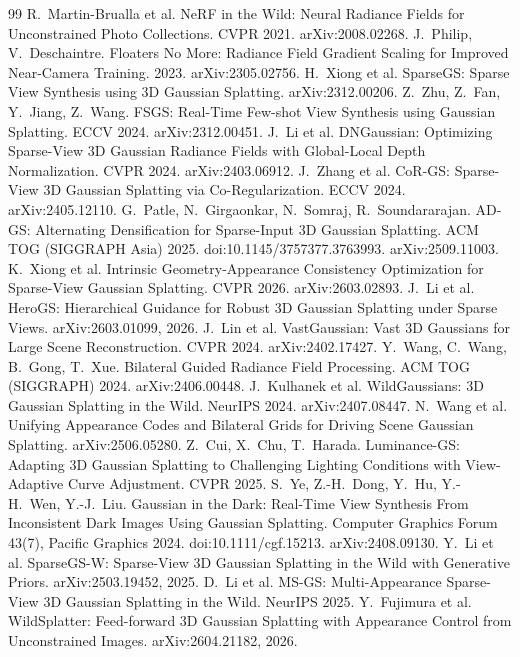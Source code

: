 \documentclass[11pt,a4paper]{article}
\begin{document}
\begin{thebibliography}{99}\small
{} R.~Martin-Brualla et al. NeRF in the Wild: Neural Radiance Fields for Unconstrained Photo Collections. CVPR 2021. arXiv:2008.02268.
 J.~Philip, V.~Deschaintre. Floaters No More: Radiance Field Gradient Scaling for Improved Near-Camera Training. 2023. arXiv:2305.02756.
 H.~Xiong et al. SparseGS: Sparse View Synthesis using 3D Gaussian Splatting. arXiv:2312.00206.
 Z.~Zhu, Z.~Fan, Y.~Jiang, Z.~Wang. FSGS: Real-Time Few-shot View Synthesis using Gaussian Splatting. ECCV 2024. arXiv:2312.00451.
 J.~Li et al. DNGaussian: Optimizing Sparse-View 3D Gaussian Radiance Fields with Global-Local Depth Normalization. CVPR 2024. arXiv:2403.06912.
 J.~Zhang et al. CoR-GS: Sparse-View 3D Gaussian Splatting via Co-Regularization. ECCV 2024. arXiv:2405.12110.
 G.~Patle, N.~Girgaonkar, N.~Somraj, R.~Soundararajan. AD-GS: Alternating Densification for Sparse-Input 3D Gaussian Splatting. ACM TOG (SIGGRAPH Asia) 2025. doi:10.1145/3757377.3763993. arXiv:2509.11003.
 K.~Xiong et al. Intrinsic Geometry-Appearance Consistency Optimization for Sparse-View Gaussian Splatting. CVPR 2026. arXiv:2603.02893.
 J.~Li et al. HeroGS: Hierarchical Guidance for Robust 3D Gaussian Splatting under Sparse Views. arXiv:2603.01099, 2026.
 J.~Lin et al. VastGaussian: Vast 3D Gaussians for Large Scene Reconstruction. CVPR 2024. arXiv:2402.17427.
 Y.~Wang, C.~Wang, B.~Gong, T.~Xue. Bilateral Guided Radiance Field Processing. ACM TOG (SIGGRAPH) 2024. arXiv:2406.00448.
 J.~Kulhanek et al. WildGaussians: 3D Gaussian Splatting in the Wild. NeurIPS 2024. arXiv:2407.08447.
 N.~Wang et al. Unifying Appearance Codes and Bilateral Grids for Driving Scene Gaussian Splatting. arXiv:2506.05280.
 Z.~Cui, X.~Chu, T.~Harada. Luminance-GS: Adapting 3D Gaussian Splatting to Challenging Lighting Conditions with View-Adaptive Curve Adjustment. CVPR 2025.
 S.~Ye, Z.-H.~Dong, Y.~Hu, Y.-H.~Wen, Y.-J.~Liu. Gaussian in the Dark: Real-Time View Synthesis From Inconsistent Dark Images Using Gaussian Splatting. Computer Graphics Forum 43(7), Pacific Graphics 2024. doi:10.1111/cgf.15213. arXiv:2408.09130.
 Y.~Li et al. SparseGS-W: Sparse-View 3D Gaussian Splatting in the Wild with Generative Priors. arXiv:2503.19452, 2025.
 D.~Li et al. MS-GS: Multi-Appearance Sparse-View 3D Gaussian Splatting in the Wild. NeurIPS 2025.
 Y.~Fujimura et al. WildSplatter: Feed-forward 3D Gaussian Splatting with Appearance Control from Unconstrained Images. arXiv:2604.21182, 2026.
\end{thebibliography}
\end{document}
